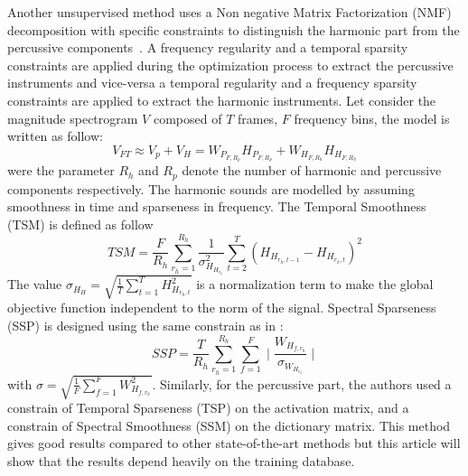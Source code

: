 Another unsupervised method uses a Non negative Matrix Factorization (NMF) decomposition with specific constraints to distinguish the harmonic part from the percussive components~\cite{canadas2014percussive}. A frequency regularity and a temporal sparsity constraints are applied during the optimization process to extract the percussive instruments and vice-versa a temporal regularity and a frequency sparsity constraints are applied to extract the harmonic instruments. Let consider the magnitude spectrogram $V$ composed of $T$ frames, $F$ frequency bins, the model is written as follow:
$$ V_{FT} \approx V_p + V_H = W_{P_{F,R_p}} H_{P_{F,R_p}} + W_{H_{F,R_h}} H_{H_{F,R_h}} $$
were the parameter $R_h$ and $R_p$ denote the number of harmonic and percussive components respectively. The harmonic sounds are modelled by assuming smoothness in time and sparseness in frequency. The Temporal Smoothness (TSM) is defined as follow 
\begin{equation}
TSM = \frac{F}{R_h} \sum_{r_h=1}^{R_h}\frac{1}{\sigma_{H_{H_{r_h}}}^2} \sum_{t=2}^{T}(H_{H_{r_h,t-1}} - H_{H_{r_h,t}})^2
\end{equation}
The value $\sigma_{H_{H}} = \sqrt{\frac{1}{T} \sum_{t=1}^{T} H_{H_{r_h,t}}^2 }$ is a normalization term to make the global objective function independent to the norm of the signal. Spectral Sparseness (SSP) is designed using the same constrain as in \cite{Virtanen}:
\begin{equation}
SSP = \frac{T}{R_h} \sum_{r_h=1}^{R_h}\sum_{f=1}^{F} \mid\frac{W_{H_{f,r_h}}}{\sigma_{W_{H_{r_h}}}}\mid
\end{equation}
with $\sigma = \sqrt{\frac{1}{F} \sum_{f=1}^{F} W_{H_{f,r_h}}^2 }$.
Similarly, for the percussive part, the authors used a constrain of Temporal Sparseness (TSP) on the activation matrix, and a constrain of Spectral Smoothness (SSM) on the dictionary matrix. 
This method gives good results compared to other state-of-the-art methods but this article will show that the results depend heavily on the training database.

